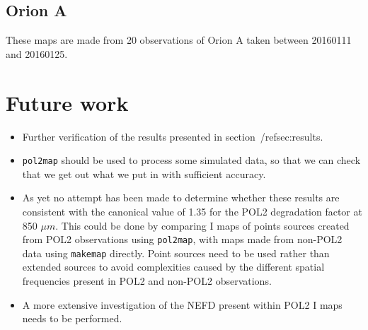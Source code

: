 \documentclass[twoside,11pt]{starlink}
\begin{document}
\subsection{Orion A}
These maps are made from 20 observations of Orion A taken between 20160111
and 20160125.










\section{Future work}

\begin{itemize}
\item Further verification of the results presented in section~/ref{sec:results}.
\item \texttt{pol2map} should be used to process some simulated data, so that
we can check that we get out what we put in with sufficient accuracy.
\item As yet no attempt has been made to determine whether these results are
consistent with the canonical value of 1.35 for the POL2 degradation factor at 850
$\mu m$. This could be done by comparing I maps of points sources
created from POL2 observations using \texttt{pol2map}, with maps made
from non-POL2 data using \texttt{makemap} directly. Point sources need to
be used rather than extended sources to avoid complexities caused by the different spatial frequencies
present in POL2 and non-POL2 observations.
\item A more extensive investigation of the NEFD present within POL2 I
maps needs to be performed.
\end{itemize}
\end{document}

